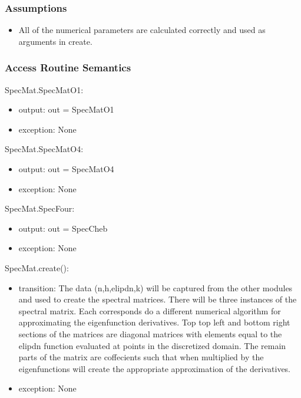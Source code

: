 \documentclass[12pt, titlepage]{article}
\begin{document}
\subsubsection{Assumptions}

\begin{itemize}
	\item All of the numerical parameters are calculated correctly and used as 
	arguments in create. 
\end{itemize}

\subsubsection{Access Routine Semantics}

SpecMat.SpecMatO1:
\begin{itemize}
	\item output: out = SpecMatO1 
	\item exception: None 
\end{itemize}

SpecMat.SpecMatO4:
\begin{itemize}
	\item output: out = SpecMatO4
	\item exception: None
\end{itemize}

SpecMat.SpecFour:
\begin{itemize}
	\item output: out = SpecCheb 
	\item exception: None
\end{itemize}

SpecMat.create():
\begin{itemize}
	\item transition: The data (n,h,elipdn,k) will be captured from the other 
	modules and used to create the spectral matrices. There will be three 
	instances of the spectral matrix. Each corresponds do a different numerical 
	algorithm for approximating the eigenfunction derivatives. Top top left and 
	bottom right sections of the matrices are diagonal matrices with elements 
	equal to the elipdn function evaluated at points in the discretized domain. 
	The remain parts of the matrix are coffecients such that when multiplied by 
	the eigenfunctions will create the appropriate approximation of the 
	derivatives. 
	\item exception: None
\end{itemize}

\newpage
\end{document}
